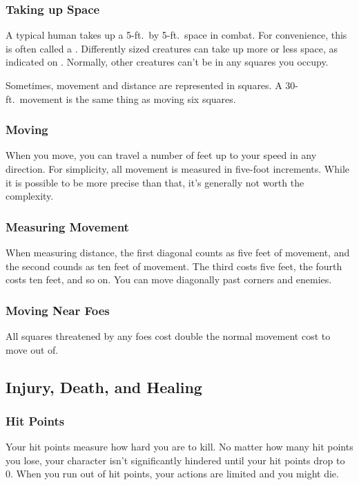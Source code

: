         \subsubsection{Taking up Space}
            A typical human takes up a 5-ft.\ by 5-ft.\ space in combat.
            For convenience, this is often called a .
            Differently sized creatures can take up more or less space, as indicated on .
            Normally, other creatures can't be in any squares you occupy.

            Sometimes, movement and distance are represented in squares.
            A 30-ft.\ movement is the same thing as moving six squares.

        \subsubsection{Moving}

            When you move, you can travel a number of feet up to your speed in any direction.
            For simplicity, all movement is measured in five-foot increments.
            While it is possible to be more precise than that, it's generally not worth the complexity.

        \subsubsection{Measuring Movement}

             When measuring distance, the first diagonal counts as five feet of movement, and the second counds as ten feet of movement.
            The third costs five feet, the fourth costs ten feet, and so on.
            You can move diagonally past corners and enemies.

        \subsubsection{Moving Near Foes}\label{Moving Near Foes}
            All squares threatened by any foes cost double the normal movement cost to move out of.

    \subsection{Injury, Death, and Healing}\label{Injury, Death, and Healing}

        \subsubsection{Hit Points}\label{Hit Points}
            Your hit points measure how hard you are to kill.
            No matter how many hit points you lose, your character isn't significantly hindered until your hit points drop to 0.
            When you run out of hit points, your actions are limited and you might die.

